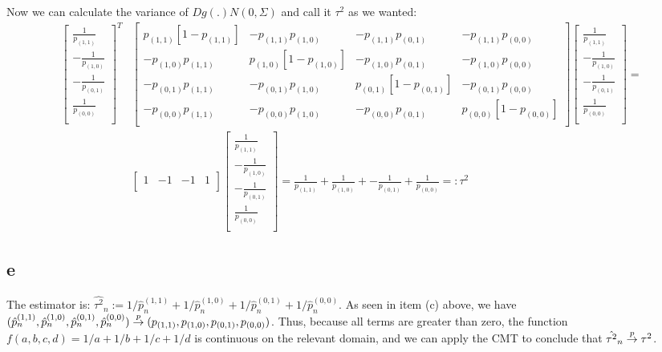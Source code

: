 \documentclass[12pt]{paper}
\begin{document}
Now we can calculate the variance of $Dg(.)N(0,\Sigma)$ and call it $\tau^2$ as we wanted:
\begin{equation}
\begin{split}
\begin{bmatrix}
\frac{1}{p_{(1,1)}}\\
-\frac{1}{ p_{(1,0)}}\\
-\frac{1}{p_{(0,1)}}\\
\frac{1}{p_{(0,0)}}\\
\end{bmatrix}^{T}
&\begin{bmatrix}
p_{(1,1)}[1-p_{(1,1)}] & -p_{(1,1)}p_{(1,0)} & -p_{(1,1)}p_{(0,1)} & -p_{(1,1)}p_{(0,0)} \\
-p_{(1,0)}p_{(1,1)} &  p_{(1,0)}[1-p_{(1,0)}] & -p_{(1,0)}p_{(0,1)} & -p_{(1,0)}p_{(0,0)} \\
-p_{(0,1)}p_{(1,1)} & -p_{(0,1)}p_{(1,0)} & p_{(0,1)}[1-p_{(0,1)}] & -p_{(0,1)}p_{(0,0)}\\
-p_{(0,0)}p_{(1,1)} & -p_{(0,0)}p_{(1,0)} & -p_{(0,0)}p_{(0,1)} & p_{(0,0)}[1-p_{(0,0)}] \\
\end{bmatrix}
\begin{bmatrix}
\frac{1}{p_{(1,1)}}\\
-\frac{1}{ p_{(1,0)}}\\
-\frac{1}{p_{(0,1)}}\\
\frac{1}{p_{(0,0)}}\\
\end{bmatrix}=\\
&\begin{bmatrix}
1&-1&-1&1\\
\end{bmatrix}
\begin{bmatrix}
\frac{1}{p_{(1,1)}}\\
-\frac{1}{ p_{(1,0)}}\\
-\frac{1}{p_{(0,1)}}\\
\frac{1}{p_{(0,0)}}\\
\end{bmatrix}=\frac{1}{p_{(1,1)}}+\frac{1}{ p_{(1,0)}}+-\frac{1}{p_{(0,1)}}+\frac{1}{p_{(0,0)}}=:\tau^2
\end{split}
\end{equation}

\subsection*{e}

The estimator is: $\hat{\tau^2}_n:=1/\hat{p}_{n}^{(1,1)}+1/\hat{p}_{n}^{(1,0)}+1/\hat{p}_{n}^{(0,1)}+1/\hat{p}_{n}^{(0,0)}$. As seen in item (c) above, we have $(\hat{p}_{n}^{(1,1)},\hat{p}_{n}^{(1,0)},\hat{p}_{n}^{(0,1)},\hat{p}_{n}^{(0,0)})\overset{p}{\to}(p_{(1,1)},p_{(1,0)},p_{(0,1)},p_{(0,0)})$. Thus, because all terms are greater than zero, the function $f(a,b,c,d)=1/a+1/b+1/c+1/d$ is continuous on the relevant domain, and we can apply the CMT to conclude that $\hat{\tau^2}_n\overset{p}{\to} \tau^2$.
\end{document}
